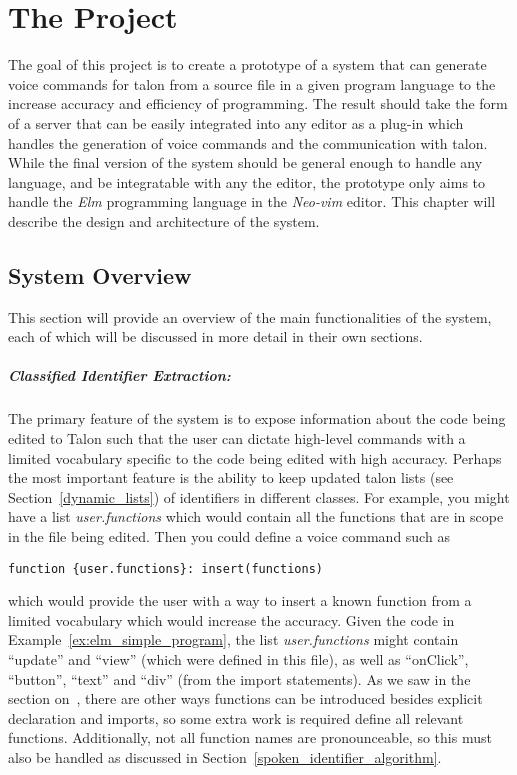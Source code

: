 \documentclass[../thesis.tex]{subfiles}
\begin{document}
\chapter{The Project}\label{the_project}
The goal of this project is to create a prototype of a system that can generate voice commands
for talon from a source file in a given program language to the increase accuracy and efficiency of programming.
The result should take the form of a server that can be easily integrated into any editor as a plug-in
which handles the generation of voice commands and the communication with talon.
While the final version of the system should be general enough to handle any language, and be integratable with any the editor,
the prototype only aims to handle the \textit{Elm} programming language in the \textit{Neo-vim} editor.
This chapter will describe the design and architecture of the system.

\section{System Overview}%
\label{sec:voice_command_generation}
This section will provide an overview of the main functionalities of the system,
each of which will be discussed in more detail in their own sections.

\paragraph{Classified Identifier Extraction:}%
\label{par:classified_identifier_extraction}
The primary feature of the system is to expose information about the code being edited
to Talon such that the user can dictate high-level commands with a limited vocabulary
specific to the code being edited with high accuracy.
Perhaps the most important feature is the ability to keep updated talon lists (see Section~\ref{dynamic_lists})
of identifiers in different classes. For example, you might have a list \textit{user.functions} which would contain
all the functions that are in scope in the file being edited.
Then you could define a voice command such as 
\begin{verbatim}
function {user.functions}: insert(functions)
\end{verbatim} 
which would provide the user with a way to insert a known function from a limited vocabulary which would increase the accuracy.
Given the code in Example~\ref{ex:elm_simple_program}, the list \textit{user.functions} might contain ``update'' and ``view''
(which were defined in this file), as well as ``onClick'', ``button'', ``text'' and ``div'' (from the import statements).
As we saw in the section on~, there are other ways functions can be introduced
besides explicit declaration and imports, so some extra work is required define all relevant functions.
Additionally, not all function names are pronounceable, so this must also be handled as discussed in Section~\ref{spoken_identifier_algorithm}.
\end{document}
